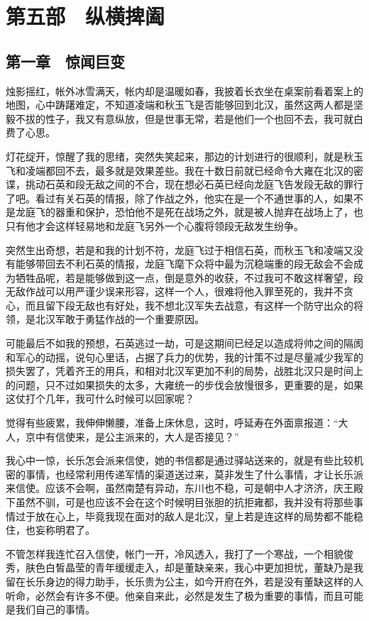 \part{第五部　纵横捭阖}

\chapter{第一章　惊闻巨变}

烛影摇红，帐外冰雪满天，帐内却是温暖如春，我披着长衣坐在桌案前看着案上的地图，心中踌躇难定，不知道凌端和秋玉飞是否能够回到北汉，虽然这两人都是坚毅不拔的性子，我又有意纵放，但是世事无常，若是他们一个也回不去，我可就白费了心思。

灯花绽开，惊醒了我的思绪，突然失笑起来，那边的计划进行的很顺利，就是秋玉飞和凌端都回不去，最多就是效果差些。我在十数日前就已经命令大雍在北汉的密谍，挑动石英和段无敌之间的不合，现在想必石英已经向龙庭飞告发段无敌的罪行了吧。看过有关石英的情报，除了作战之外，他实在是一个不通世事的人，如果不是龙庭飞的器重和保护，恐怕他不是死在战场之外，就是被人抛弃在战场上了，也只有他才会这样轻易地和龙庭飞另外一个心腹将领段无敌发生纷争。

突然生出奇想，若是和我的计划不符，龙庭飞过于相信石英，而秋玉飞和凌端又没有能够带回去不利石英的情报，龙庭飞麾下众将中最为沉稳端重的段无敌会不会成为牺牲品呢，若是能够做到这一点，倒是意外的收获，不过我可不敢这样奢望，段无敌作战可以用严谨少误来形容，这样一个人，很难将他入罪至死的，我并不贪心，而且留下段无敌也有好处，我不想北汉军失去战意，有这样一个防守出众的将领，是北汉军敢于勇猛作战的一个重要原因。

可能最后不如我的预想，石英逃过一劫，可是这期间已经足以造成将帅之间的隔阂和军心的动摇，说句心里话，占据了兵力的优势，我的计策不过是尽量减少我军的损失罢了，凭着齐王的用兵，和相对北汉军更加不利的局势，战胜北汉只是时间上的问题，只不过如果损失的太多，大雍统一的步伐会放慢很多，更重要的是，如果这仗打个几年，我可什么时候可以回家呢？

觉得有些疲累，我伸伸懒腰，准备上床休息，这时，呼延寿在外面禀报道：“大人，京中有信使来，是公主派来的，大人是否接见？”

我心中一惊，长乐怎会派来信使，她的书信都是通过驿站送来的，就是有些比较机密的事情，也经常利用传递军情的渠道送过来，莫非发生了什么事情，才让长乐派来信使。应该不会啊，虽然南楚有异动，东川也不稳，可是朝中人才济济，庆王殿下虽然不驯，可是也应该不会在这个时候明目张胆的抗拒雍都，我并没有将那些事情过于放在心上，毕竟我现在面对的敌人是北汉，皇上若是连这样的局势都不能稳住，也妄称明君了。

不管怎样我连忙召入信使，帐门一开，冷风透入，我打了一个寒战，一个相貌俊秀，肤色白皙晶莹的青年缓缓走入，却是董缺亲来，我心中更加担忧，董缺乃是我留在长乐身边的得力助手，长乐贵为公主，如今开府在外，若是没有董缺这样的人听命，必然会有许多不便。他亲自来此，必然是发生了极为重要的事情，而且可能是我们自己的事情。

